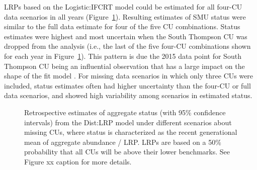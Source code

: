 \documentclass[11pt]{book}
\begin{document}
LRPs based on the Logistic:IFCRT model could be estimated for all four-CU data scenarios in all years (Figure~\ref{fig:coho-distributional-missingCUs}). Resulting estimates of SMU status were similar to the full data estimate for four of the five CU combinations. Status estimates were highest and most uncertain when the South Thompson CU was dropped from the analysis (i.e., the last of the five four-CU combinations shown for each year in Figure~\ref{fig:coho-distributional-missingCUs}). This pattern is due the 2015 data point for South Thompson CU being an influential observation that has a large impact on the shape of the fit model . For missing data scenarios in which only three CUs were included, status estimates often had higher uncertainty than the four-CU or full data scenarios, and showed high variability among scenarios in estimated status.
\begin{figure}[htb]

{\centering {} 

}

\caption{Retrospective estimates of aggregate status (with 95\% confidence intervals) from the Dist:LRP model under different scenarios about missing CUs, where status is characterized as the recent generational mean of aggregate abundance / LRP. LRPs are based on a 50\% probability that all CUs will be above their lower benchmarks. See Figure xx caption for more details.}\label{fig:coho-distributional-missingCUs}
\end{figure}
\linebreak
\end{document}

